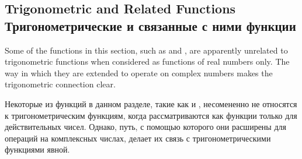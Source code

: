 \subsection{Trigonometric and Related Functions Тригонометрические и связанные с
ними функции}

Some of the functions in this section, such as 
and , are apparently unrelated
to trigonometric functions when considered as functions of
real numbers only.  The way in which they are extended to
operate on complex numbers makes the trigonometric connection clear.

Некоторые из функций в данном разделе, такие как  и ,
несомененно не относятся к тригонометрическим функциям, когда рассматриваются
как функции только для действительных чисел. Однако, путь, с помощью которого
они расширены для операций на комплексных числах, делает их связь с
тригонометрическими функциями явной.

